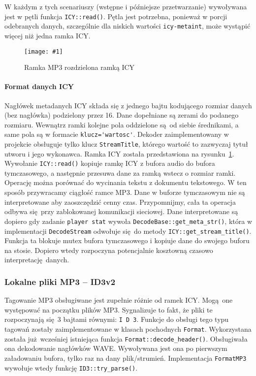 \documentclass[12pt]{report}
\newcommand{\imgint}[4]{
	\begin{figure}[{#4}]
		\centering
		\texttt{[image: \#1]}
		\caption{#2}
		\label{#1}
	\end{figure}
}
\newcommand{\imgcs}[3]{\imgint{#1}{#2}{#3}{}}
\begin{document}
		W każdym z tych scenariuszy (wstępne i późniejsze przetwarzanie) wywoływana jest w pętli funkcja \lstinline|ICY::read()|. Pętla jest potrzebna, ponieważ w porcji odebranych danych, szczególnie dla niskich wartości \lstinline|icy-metaint|, może wystąpić więcej niż jedna ramka ICY.
		
		\imgcs{3/PicoRadio-icy}{Ramka MP3 rozdzielona ramką ICY}{0.9}
		\paragraph{Format danych ICY}
			Nagłówek metadanych ICY składa się z jednego bajtu kodującego rozmiar danych (bez nagłówka) podzielony przez 16. Dane dopełniane są zerami do podanego rozmiaru. Wewnątrz ramki kolejne pola oddzielone są od siebie średnikami, a same pola są w formacie \lstinline|klucz='wartosc'|. Dekoder zaimplementowany w projekcie obsługuje tylko klucz \lstinline|StreamTitle|, którego wartość to zazwyczaj tytuł utworu i jego wykonawca. Ramka ICY została przedstawiona na rysunku~\ref{3/PicoRadio-icy}.
			$ $\\
			
		Wywołanie \lstinline|ICY::read()| kopiuje ramkę ICY z bufora audio do bufora tymczasowego, a następnie przesuwa dane za ramką wstecz o rozmiar ramki. Operację można porównać do wycinania tekstu z dokumentu tekstowego. W ten sposób przywracamy ciągłość ramce MP3. Dane w buforze tymczasowym nie są interpretowane aby zaoszczędzić cenny czas. Przypomnijmy, cała ta operacja odbywa się przy zablokowanej komunikacji sieciowej. Dane interpretowane są dopiero gdy zadanie \lstinline|player stat| wywoła \lstinline|DecodeBase::get_meta_str()|, która w implementacji \lstinline|DecodeStream| odwołuje się do metody \lstinline|ICY::get_stream_title()|. Funkcja ta blokuje mutex bufora tymczasowego i kopiuje dane do swojego buforu na stosie. Dopiero wtedy rozpoczyna potencjalnie kosztowną czasowo interpretację danych.
	
	\subsubsection{Lokalne pliki MP3 -- ID3v2}
		Tagowanie MP3 obsługiwane jest zupełnie różnie od ramek ICY. Mogą one występować na początku plików MP3. Sygnalizuje to fakt, że pliki te rozpoczynają się 3 bajtami równymi: \lstinline|I D 3|. Funkcje do obsługi tego typu tagowań zostały zaimplementowane w klasach pochodnych \lstinline|Format|. Wykorzystana została już wcześniej istniejąca funkcja \lstinline|Format::decode_header()|. Obsługiwała ona dekodowanie nagłówków WAVE. Wywoływana jest ona po pierwszym załadowaniu bufora, tylko raz na dany plik/strumień. Implementacja \lstinline|FormatMP3| wywołuje wtedy funkcję \lstinline|ID3::try_parse()|.
		
\end{document}
